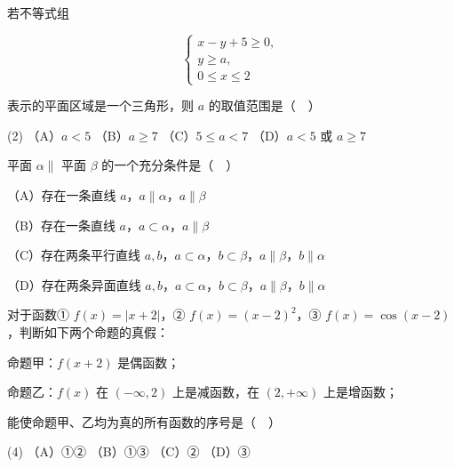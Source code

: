 \begin{question}
若不等式组

\nopagebreak[4]
\[
\begin{cases}
x-y+5\geq 0,\\
y\geq a,\\
0\leq x\leq 2
\end{cases}
\]

表示的平面区域是一个三角形，则 $a$ 的取值范围是（　）

\begin{gkopts}(2)
\task （A）$a<5$
\task （B）$a\geq 7$
\task （C）$5\leq a<7$
\task （D）$a<5$ 或 $a\geq 7$
\end{gkopts}

\end{question}
\begin{question}
平面 $\alpha\parallel$ 平面 $\beta$ 的一个充分条件是（　）

（A）存在一条直线 $a$，$a\parallel\alpha$，$a\parallel\beta$

（B）存在一条直线 $a$，$a\subset\alpha$，$a\parallel\beta$

（C）存在两条平行直线 $a,b$，$a\subset\alpha$，$b\subset\beta$，$a\parallel\beta$，$b\parallel\alpha$

（D）存在两条异面直线 $a,b$，$a\subset\alpha$，$b\subset\beta$，$a\parallel\beta$，$b\parallel\alpha$

\end{question}
\begin{question}
对于函数① $f(x)=|x+2|$，② $f(x)=(x-2)^2$，③ $f(x)=\cos(x-2)$，判断如下两个命题的真假：

命题甲：$f(x+2)$ 是偶函数；

命题乙：$f(x)$ 在 $(-\infty,2)$ 上是减函数，在 $(2,+\infty)$ 上是增函数；

能使命题甲、乙均为真的所有函数的序号是（　）

\begin{gkopts}(4)
\task （A）①②
\task （B）①③
\task （C）②
\task （D）③
\end{gkopts}

\end{question}

